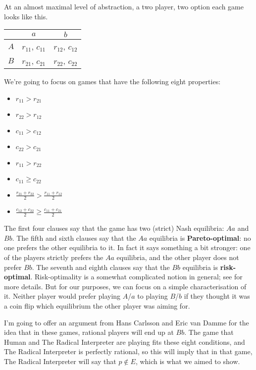 At an almost maximal level of abstraction, a two player, two option each game looks like this.


\begin{center}
\begin{tabular}{r | c c}
& $a$ & $b$  \\\hline
$A$ & $r_{11}$, $c_{11}$ & $r_{12}$, $c_{12}$ \\
$B$ & $r_{21}$, $c_{21}$ & $r_{22}$, $c_{22}$
\end{tabular}
\end{center}


We're going to focus on games that have the following eight properties:

\begin{itemize}
\item $r_{11} > r_{21}$

\item $r_{22} > r_{12}$

\item $c_{11} > c_{12}$

\item $c_{22} > c_{21}$

\item $r_{11} > r_{22}$

\item $c_{11} \geq c_{22}$

\item $\frac{r_{21}+r_{22}}{2} > \frac{r_{11}+r_{12}}{2}$

\item $\frac{c_{12}+c_{22}}{2} \geq \frac{c_{11}+c_{21}}{2}$

\end{itemize}
The first four clauses say that the game has two (strict) Nash equilibria: $Aa$ and $Bb$. The fifth and sixth clauses say that the $Aa$ equilibria is \textbf{Pareto-optimal}: no one prefers the other equilibria to it. In fact it says something a bit stronger: one of the players strictly prefers the $Aa$ equilibria, and the other player does not prefer $Bb$. The seventh and eighth clauses say that the $Bb$ equilibria is \textbf{risk-optimal}. Risk-optimality is a somewhat complicated notion in general; see  \citet{HarsanyiSelten1988} for more details. But for our purposes, we can focus on a simple characterisation of it. Neither player would prefer playing $A$\slash $a$ to playing $B$\slash $b$ if they thought it was a coin flip which equilibrium the other player was aiming for.

I'm going to offer an argument from Hans Carlsson and Eric van Damme \citeyearpar{CarlssonVanDamme1993} for the idea that in these games, rational players will end up at $Bb$. The game that Human and The Radical Interpreter are playing fits these eight conditions, and The Radical Interpreter is perfectly rational, so this will imply that in that game, The Radical Interpreter will say that $p \notin E$, which is what we aimed to show.

